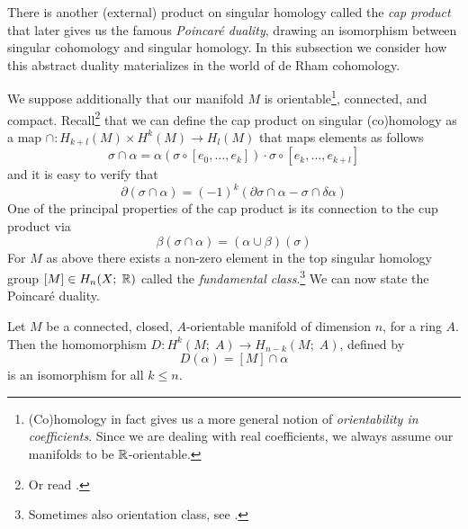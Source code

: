 \documentclass[a4paper, 12pt]{article}
\begin{document}
There is another (external) product on singular homology called the \emph{cap
product} that later gives us the famous \emph{Poincar\'e duality}, drawing an
isomorphism between singular cohomology and singular homology.  In this
subsection we consider how this abstract duality materializes in the world of
de Rham cohomology.

We suppose additionally that our manifold $M$ is
orientable\footnote{(Co)homology in fact gives us a more general notion of
\emph{orientability in coefficients}. Since we are dealing with real
coefficients, we always assume our manifolds to be $\mathbb{R}$-orientable.}, connected,
and compact.
Recall\footnote{Or read \cite[pp. 236--241]{Hatcher2002}.} that we can define the cap product on singular (co)homology as a map
$\cap \colon H_{k+l}(M) \times H^k(M) \to H_l(M)$
that maps elements as follows
\[
    \sigma \cap \alpha = \alpha(\sigma\circ[e_0,\dots,e_k]) \cdot \sigma\circ[e_k,\dots,e_{k+l}]
\]
and it is easy to verify that
\[
    \partial(\sigma \cap \alpha) = (-1)^k (\partial\sigma \cap \alpha - \sigma \cap \delta\alpha)
\]
One of the principal properties of the cap product is its connection to the cup product via
\[
    \beta (\sigma \cap \alpha) = (\alpha \cup \beta) (\sigma)
\]
For $M$ as above there exists a non-zero element in the top singular homology group $[M] \in H_n(X; \; \mathbb{R})$ called the \emph{fundamental class}.\footnote{Sometimes also orientation class, see \cite[p. 236]{Hatcher2002}.}
We can now state the Poincar\'e duality.
\begin{theorem}
    Let $M$ be a connected, closed, $A$-orientable manifold of dimension $n$, for a ring $A$.
    Then the homomorphism $D \colon H^k(M; \; A) \to H_{n-k}(M ; \; A)$, defined by
    \[
        D(\alpha) = [M] \cap \alpha
    \]
    is an isomorphism for all $k \leq n$.
\end{theorem}
\end{document}
